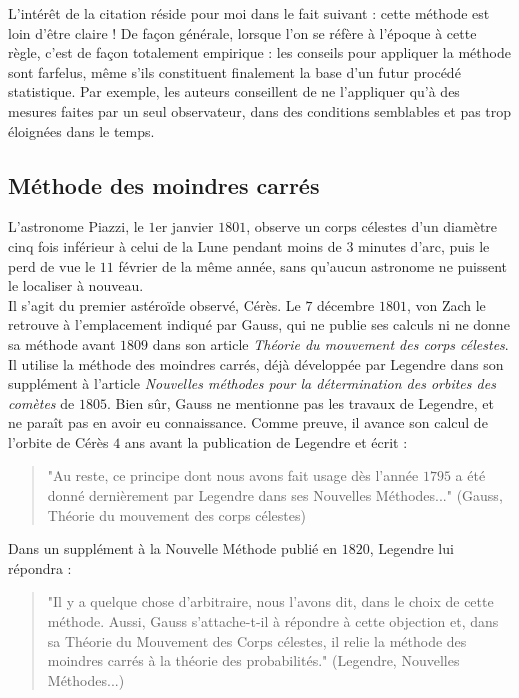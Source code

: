 \documentclass{article}
\begin{document}
L'intérêt de la citation réside pour moi dans le fait suivant : cette méthode est loin d'être claire ! De façon générale, lorsque l'on se réfère à l'époque à cette règle, c'est de façon totalement empirique : les conseils pour appliquer la méthode sont farfelus, même s'ils constituent finalement la base d'un futur procédé statistique. Par exemple, les auteurs conseillent de ne l'appliquer qu'à des mesures faites par un seul observateur, dans des conditions semblables et pas trop éloignées dans le temps.

\subsection{Méthode des moindres carrés}

L'astronome Piazzi, le $1$er janvier $1801$, observe un corps célestes d'un diamètre cinq fois inférieur à celui de la Lune pendant moins de $3$ minutes d'arc, puis le perd de vue le $11$ février de la même année, sans qu'aucun astronome ne puissent le localiser à nouveau.\\

Il s'agit du premier astéroïde observé, Cérès. Le $7$ décembre $1801$, von Zach le retrouve à l'emplacement indiqué par Gauss, qui ne publie ses calculs ni ne donne sa méthode avant $1809$ dans son article \textit{Théorie du mouvement des corps célestes}. Il utilise la méthode des moindres carrés, déjà développée par Legendre dans son supplément à l'article \textit{Nouvelles méthodes pour la détermination des orbites des comètes} de $1805$. Bien sûr, Gauss ne mentionne pas les travaux de Legendre, et ne paraît pas en avoir eu connaissance. Comme preuve, il avance son calcul de l'orbite de Cérès $4$ ans avant la publication de Legendre et écrit :
\begin{quotation}
"Au reste, ce principe dont nous avons fait usage dès l'année $1795$ a été donné dernièrement par Legendre dans ses Nouvelles Méthodes..." (Gauss, Théorie du mouvement des corps célestes)
\end{quotation}

Dans un supplément à la Nouvelle Méthode publié en $1820$, Legendre lui répondra :
\begin{quotation}
"Il y a quelque chose d'arbitraire, nous l'avons dit, dans le choix de cette méthode. Aussi, Gauss s'attache-t-il à répondre à cette objection et, dans sa Théorie du Mouvement des Corps célestes, il relie la méthode des moindres carrés à la théorie des probabilités." (Legendre, Nouvelles Méthodes...)
\end{quotation}
\end{document}
